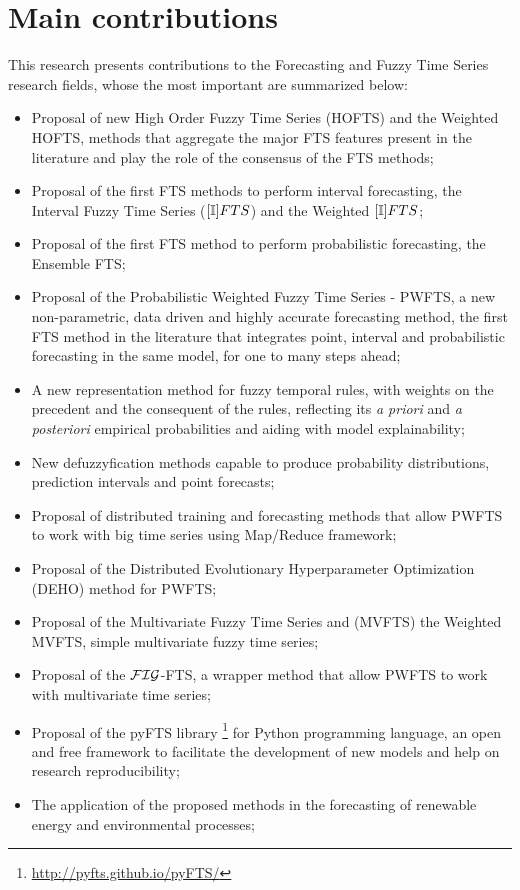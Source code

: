\section{Main contributions} 

This research presents contributions to the Forecasting and Fuzzy Time Series research fields, whose the most important are summarized below:

\begin{itemize}
    \item Proposal of new High Order Fuzzy Time Series (HOFTS) and the Weighted HOFTS, methods that aggregate the major FTS features present in the literature and play the role of the consensus of the FTS methods;
    \item Proposal of the first FTS methods to perform interval forecasting, the Interval Fuzzy Time Series ($[\mathbb{I}]FTS$) and the Weighted $[\mathbb{I}]FTS$;
    \item Proposal of the first FTS method to perform probabilistic forecasting, the Ensemble FTS;
    \item Proposal of the Probabilistic Weighted Fuzzy Time Series - PWFTS, a new non-parametric, data driven and highly accurate forecasting method, the first FTS method in the literature that integrates point, interval and probabilistic forecasting in the same model, for one to many steps ahead;
    \item A new representation method for fuzzy temporal rules, with weights on the precedent and the consequent of the rules, reflecting its \textit{a priori} and \textit{a posteriori} empirical probabilities and aiding with model explainability;
    \item New defuzzyfication methods capable to produce probability distributions, prediction intervals and point forecasts;
    \item Proposal of distributed training and forecasting methods that allow PWFTS to work with big time series using Map/Reduce framework;
    \item Proposal of the Distributed Evolutionary Hyperparameter Optimization (DEHO) method for PWFTS;
    \item Proposal of the Multivariate Fuzzy Time Series and (MVFTS) the Weighted MVFTS, simple multivariate fuzzy time series;
    \item Proposal of the $\mathcal{FIG}$-FTS, a wrapper method that allow PWFTS to work with multivariate time series;
    \item Proposal of the pyFTS library \cite{pyFTS}\footnote{\url{http://pyfts.github.io/pyFTS/}} for Python programming language, an open and free framework to facilitate the development of new models and help on research reproducibility;  
    \item The application of the proposed methods in the forecasting of renewable energy and environmental processes;
\end{itemize}



